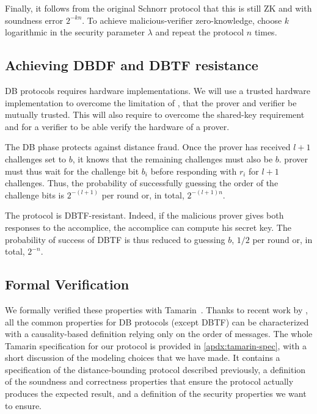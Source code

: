 Finally, it follows from the original Schnorr protocol that this is still 
\ac{ZK} and  with soundness error \(2^{-kn}\).
To achieve malicious-verifier zero-knowledge, choose \(k\) logarithmic in the 
security parameter \(\lambda\) and repeat the protocol \(n\) times.


\subsection{Achieving \acl{DBDF} and \acl{DBTF} resistance}

\Acl{DB} protocols requires hardware implementations.
We will use a trusted hardware implementation to overcome the limitation of 
\textcite{UWBPR}, \ie that the prover and verifier be mutually trusted.
This will also require  to overcome the shared-key requirement and for 
a verifier to be able verify the hardware of a prover.

The \ac{DB} phase protects against distance fraud.
Once the prover has received \(l+1\) challenges set to \(b\), it knows that the remaining challenges must also be \(b\).
 prover must thus wait for the challenge bit \(b_i\) before responding with \(r_i\) for \(l+1\) challenges.
Thus, the probability of successfully guessing the order of the challenge bits is \(2^{-(l+1)}\) per round or, in total, \(2^{-(l+1)n}\).

The protocol is \ac{DBTF}-resistant.
Indeed, if the malicious prover gives both responses to the accomplice, the 
accomplice can compute his secret key.
The probability of success of \ac{DBTF} is thus reduced to guessing \(b\), \ie \(1/2\) per round or, in total, \(2^{-n}\).

\subsection{Formal Verification}

We formally verified these properties with Tamarin~\cite{meier2013tamarin}.
Thanks to recent work by \textcite{TamarinDB}, all the common properties for 
\ac{DB} protocols (except \ac{DBTF}) can be characterized with a 
causality-based definition relying only on the order of messages.
The whole Tamarin specification for our protocol is provided in 
\cref{apdx:tamarin-spec}, with a short discussion of the modeling choices that 
we have made.
It contains a specification of the distance-bounding protocol described 
previously, a definition of the soundness and correctness properties that 
ensure the protocol actually produces the expected result, and a definition of 
the security properties we want to ensure.


